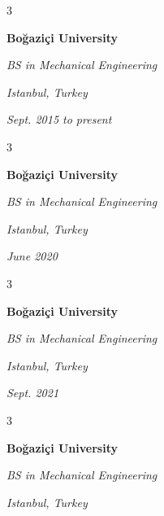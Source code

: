 \documentclass[10pt, letterpaper]{article}
\newenvironment{threecolentry}[3][]{
    \onecolentry
    \def\thirdColumn{#3}
    \setcolumnwidth{0.6 cm, \fill, 4.5 cm}
    \begin{paracol}{3}
    #2 \switchcolumn
}{
    \switchcolumn \raggedleft \thirdColumn
    \end{paracol}
    \endonecolentry
} %
\begin{document}
        \vspace{0.2 cm-3px}

        \begin{threecolentry}{
            \vspace*{\fill}
            \textbullet
            \vspace*{3px}
            \vspace*{\fill}
        }{
        \textit{Istanbul, Turkey}    
            
        \textit{Sept. 2015 to present}}
            \textbf{Boğaziçi University}

            \textit{BS in Mechanical Engineering}
        \end{threecolentry}



        \vspace{0.2 cm-3px}

        \begin{threecolentry}{
            \vspace*{\fill}
            \textbullet
            \vspace*{3px}
            \vspace*{\fill}
        }{
        \textit{Istanbul, Turkey}    
            
        \textit{June 2020}}
            \textbf{Boğaziçi University}

            \textit{BS in Mechanical Engineering}
        \end{threecolentry}



        \vspace{0.2 cm-3px}

        \begin{threecolentry}{
            \vspace*{\fill}
            \textbullet
            \vspace*{3px}
            \vspace*{\fill}
        }{
        \textit{Istanbul, Turkey}    
            
        \textit{Sept. 2021}}
            \textbf{Boğaziçi University}

            \textit{BS in Mechanical Engineering}
        \end{threecolentry}



        \vspace{0.2 cm-3px}

        \begin{threecolentry}{
            \vspace*{\fill}
            \textbullet
            \vspace*{3px}
            \vspace*{\fill}
        }{
        \textit{Istanbul, Turkey}    
            
        }
            \textbf{Boğaziçi University}

            \textit{BS in Mechanical Engineering}
        \end{threecolentry}
\end{document}
